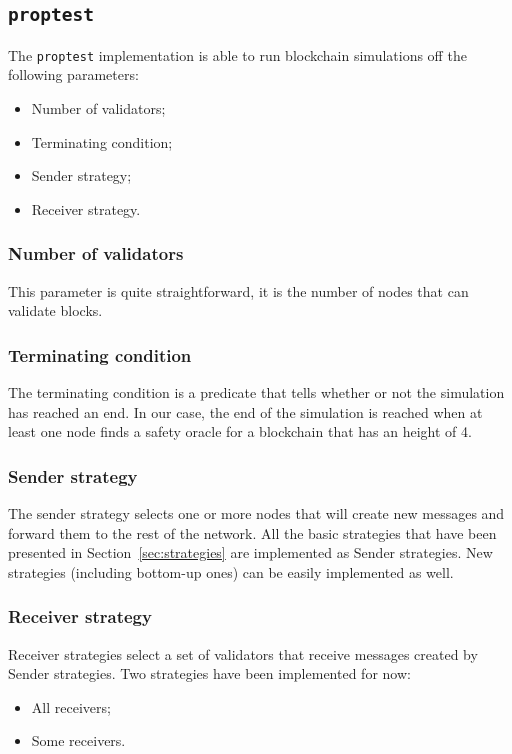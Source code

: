 \subsection{\texttt{proptest}}
The \texttt{proptest} implementation is able to run blockchain simulations off
the following parameters:
\begin{itemize}
    \item Number of validators;
    \item Terminating condition;
    \item Sender strategy;
    \item Receiver strategy.
\end{itemize}

\subsubsection{Number of validators}
This parameter is quite straightforward, it is the number of nodes that can
validate blocks.

\subsubsection{Terminating condition}
The terminating condition is a predicate that tells whether or not the simulation has
reached an end. In our case, the end of the simulation is reached when at least
one node finds a safety oracle for a blockchain that has an height of 4.

\subsubsection{Sender strategy}
The sender strategy selects one or more nodes that will create new messages and
forward them to the rest of the network. All the basic strategies that have been
presented in Section~\ref{sec:strategies} are implemented as Sender strategies.
New strategies (including bottom-up ones) can be easily implemented as well.

\subsubsection{Receiver strategy}
Receiver strategies select a set of validators that receive messages created by
Sender strategies. Two strategies have been implemented for now: 
\begin{itemize}
        \item All receivers;
        \item Some receivers.
\end{itemize}

